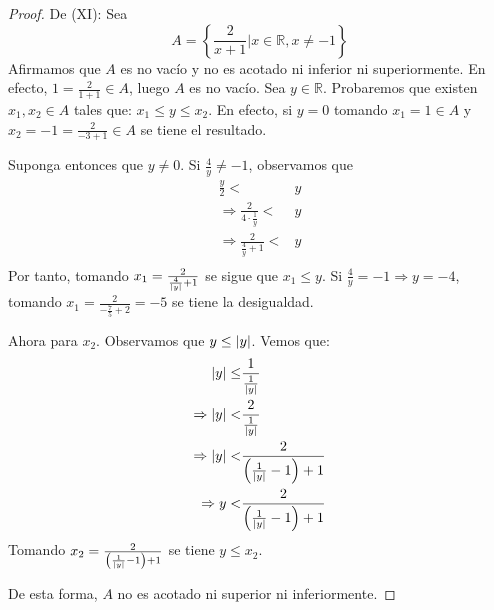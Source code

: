 \documentclass[12pt]{article}
\begin{document}
\begin{enumerate}
\begin{proof}
        De (XI): Sea
        \begin{equation*}
            A = \left\{\frac{2}{x+1}|x\in\mathbb{R},x\neq -1\right\}
        \end{equation*}
        Afirmamos que $A$ es no vacío y no es acotado ni inferior ni superiormente. En efecto, $1=\frac{2}{1+1}\in A$, luego $A$ es no vacío. Sea $y\in\mathbb{R}$. Probaremos que existen $x_1,x_2\in A$ tales que: $x_1\leq y\leq x_2$. En efecto, si $y=0$ tomando $x_1=1\in A$ y $x_2=-1=\frac{2}{-3+1}\in A$ se tiene el resultado.
        
        Suponga entonces que $y\neq 0$. Si $\frac{4}{y}\neq -1$, observamos que
        \begin{equation*}
            \begin{split}
                \frac{y}{2}<&y\\
                \Rightarrow \frac{2}{4\cdot \frac{1}{y}}<&y\\
                \Rightarrow \frac{2}{\frac{4}{y}+1}<&y\\
            \end{split}
        \end{equation*}
        Por tanto, tomando $x_1=\frac{2}{\frac{4}{\left| y \right|}+1}$ se sigue que $x_1\leq y$. Si $\frac{4}{y}= -1\Rightarrow y=-4$, tomando $x_1 = \frac{2}{-\frac{7}{5}+2}=-5$ se tiene la desigualdad.
        
        Ahora para $x_2$. Observamos que $y\leq\left| y \right|$. Vemos que:
        \begin{equation*}
            \begin{split}
                \left| y \right|\leq& \frac{1}{\frac{1}{\left| y \right|}}\\
                \Rightarrow\left| y \right|<& \frac{2}{\frac{1}{\left| y \right|}}\\
                \Rightarrow\left| y \right|<& \frac{2}{\left(\frac{1}{\left| y \right|}-1\right)+1}\\
                \Rightarrow y<& \frac{2}{\left(\frac{1}{\left| y \right|}-1\right)+1}\\
            \end{split}
        \end{equation*}
        Tomando $x_2 = \frac{2}{\left(\frac{1}{\left| y \right|}-1\right)+1}$ se tiene $y\leq x_2$. 

        De esta forma, $A$ no es acotado ni superior ni inferiormente.


\end{proof}
\end{enumerate}
\end{document}
